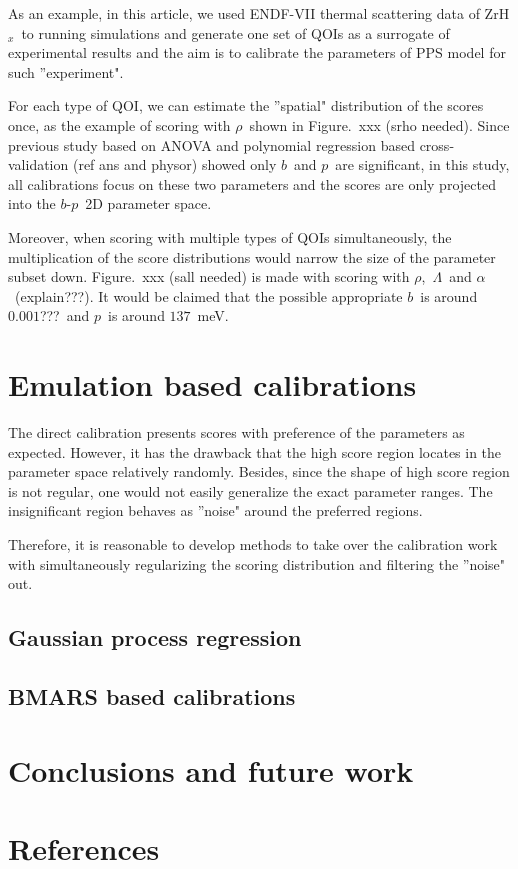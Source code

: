 \documentclass[review]{elsarticle}
\newcommand{\zh}{ZrH$_x$}
\begin{document}
As an example, in this article, we used ENDF-VII thermal scattering data of \zh~to running simulations and generate one set of QOIs as a surrogate of experimental results and the aim is to calibrate the parameters of PPS model for such ''experiment".

For each type of QOI, we can estimate the ''spatial" distribution of the scores once, as the example of scoring with $\rho$~shown in Figure.~xxx (srho needed). Since previous study based on ANOVA and polynomial regression based cross-validation (ref ans and physor) showed only $b$~and $p$~are significant, in this study, all calibrations focus on these two parameters and the scores are only projected into the $b$-$p$~2D parameter space.

Moreover, when scoring with multiple types of QOIs simultaneously, the multiplication of the score distributions would narrow the size of the parameter subset down. Figure.~xxx (sall needed) is made with scoring with $\rho$,~$\Lambda$~and $\alpha$~(explain???). It would be claimed that the possible appropriate $b$~is around $0.001$???~and $p$~is around $137$~meV.
\section{Emulation based calibrations}
The direct calibration presents scores with preference of the parameters as expected. However, it has the drawback that the high score region locates in the parameter space relatively randomly. Besides, since the shape of high score region is not regular, one would not easily generalize the exact parameter ranges. The insignificant region behaves as ''noise" around the preferred regions.

Therefore, it is reasonable to develop methods to take over the calibration work with simultaneously regularizing the scoring distribution and filtering the ''noise" out.

\subsection{Gaussian process regression}
\subsection{BMARS based calibrations}

\section{Conclusions and future work}
\section*{References}


\end{document}
